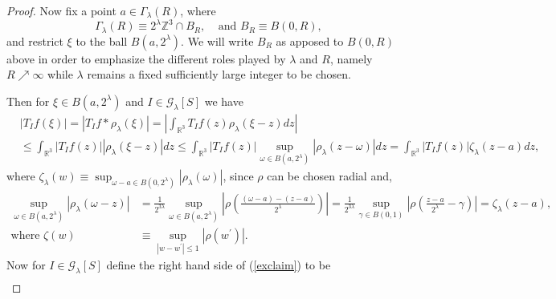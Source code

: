 \documentclass{amsart}%
\theoremstyle{plain}
\numberwithin{equation}{section}
\begin{document}
\begin{proof}
Now fix a point $a\in\Gamma_{\lambda}\left(  R\right)  $, where%
\[
\Gamma_{\lambda}\left(  R\right)  \equiv2^{\lambda}\mathbb{Z}^{3}\cap
B_{R},\ \ \ \ \ \text{and }B_{R}\equiv B\left(  0,R\right)  ,
\]
and restrict $\xi$ to the ball $B\left(  a,2^{\lambda}\right)  $. We will
write $B_{R}$ as apposed to $B\left(  0,R\right)  $ above in order to
emphasize the different roles played by $\lambda$ and $R$, namely
$R\nearrow\infty$ while $\lambda$ remains a fixed sufficiently large integer
to be chosen.

Then for $\xi\in B\left(  a,2^{\lambda}\right)  $ and $I\in\mathcal{G}%
_{\lambda}\left[  S\right]  $ we have
\begin{align}
&  \left\vert T_{I}f\left(  \xi\right)  \right\vert =\left\vert T_{I}f\ast
\rho_{\lambda}\left(  \xi\right)  \right\vert =\left\vert \int_{\mathbb{R}%
^{3}}T_{I}f\left(  z\right)  \rho_{\lambda}\left(  \xi-z\right)  dz\right\vert
\label{exclaim}\\
&  \leq\int_{\mathbb{R}^{3}}\left\vert T_{I}f\left(  z\right)  \right\vert
\left\vert \rho_{\lambda}\left(  \xi-z\right)  \right\vert dz\leq
\int_{\mathbb{R}^{3}}\left\vert T_{I}f\left(  z\right)  \right\vert
\sup_{\omega\in B\left(  a,2^{\lambda}\right)  }\left\vert \rho_{\lambda
}\left(  z-\omega\right)  \right\vert dz=\int_{\mathbb{R}^{3}}\left\vert
T_{I}f\left(  z\right)  \right\vert \zeta_{\lambda}\left(  z-a\right)
dz,\nonumber
\end{align}
where $\zeta_{\lambda}\left(  w\right)  \equiv\sup_{\omega-a\in B\left(
0,2^{\lambda}\right)  }\left\vert \rho_{\lambda}\left(  \omega\right)
\right\vert $, since $\rho$ can be chosen radial and,
\begin{align*}
\sup_{\omega\in B\left(  a,2^{\lambda}\right)  }\left\vert \rho_{\lambda
}\left(  \omega-z\right)  \right\vert  &  =\frac{1}{2^{3\lambda}}\sup
_{\omega\in B\left(  a,2^{\lambda}\right)  }\left\vert \rho\left(
\frac{\left(  \omega-a\right)  -\left(  z-a\right)  }{2^{\lambda}}\right)
\right\vert =\frac{1}{2^{3\lambda}}\sup_{\gamma\in B\left(  0,1\right)
}\left\vert \rho\left(  \frac{z-a}{2^{\lambda}}-\gamma\right)  \right\vert
=\zeta_{\lambda}\left(  z-a\right)  ,\\
\text{where }\zeta\left(  w\right)   &  \equiv\sup_{\left\vert w-w^{\prime
}\right\vert \leq1}\left\vert \rho\left(  w^{\prime}\right)  \right\vert .
\end{align*}
Now for $I\in\mathcal{G}_{\lambda}\left[  S\right]  $ define the right hand
side of (\ref{exclaim}) to be
\begin{align*}

\end{align*}
\end{proof}
\end{document}
